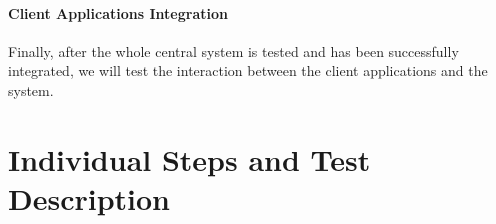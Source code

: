 \documentclass[english]{article}
\begin{document}
\begin{figure}[H]
	\centering
\end{figure}


\paragraph{Client Applications Integration}
Finally, after the whole central system is tested and has been successfully integrated, we will test the interaction between the client applications and the system.

\begin{figure}[H]
	\centering
\end{figure}



\section{Individual Steps and Test Description}

\end{document}

